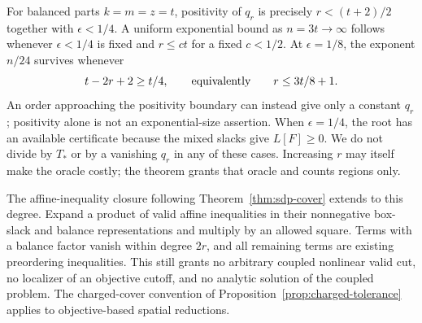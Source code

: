 For balanced parts $k=m=z=t$, positivity of $q_r$ is precisely
$r<(t+2)/2$ together with $\epsilon<1/4$. A uniform exponential
bound as $n=3t\to\infty$ follows whenever $\epsilon<1/4$ is fixed
and $r\le ct$ for a fixed $c<1/2$. At $\epsilon=1/8$, the exponent
$n/24$ survives whenever
\[
 t-2r+2\ge t/4,\qquad\hbox{equivalently}\qquad r\le3t/8+1.
\]
An order approaching the positivity boundary can instead give only a
constant $q_r$; positivity alone is not an exponential-size assertion.
When $\epsilon=1/4$, the root has an available certificate because the
mixed slacks give $L[F]\ge0$. We do not divide by $T_*$ or by a
vanishing $q_r$ in any of these cases. Increasing $r$ may itself make the
oracle costly; the theorem grants that oracle and counts regions only.

The affine-inequality closure following Theorem~\ref{thm:sdp-cover}
extends to this degree. Expand a product of valid affine inequalities
in their nonnegative box-slack and balance representations and multiply
by an allowed square. Terms with a balance factor vanish within degree
$2r$, and all remaining terms are existing preordering inequalities.
This still grants no arbitrary coupled nonlinear valid cut, no localizer
of an objective cutoff, and no analytic solution of the coupled problem.
The charged-cover convention of Proposition~\ref{prop:charged-tolerance}
applies to objective-based spatial reductions.

